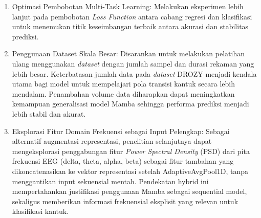 \begin{enumerate}
    \item Optimasi Pembobotan Multi-Task Learning: Melakukan eksperimen lebih lanjut pada pembobotan \textit{Loss Function} antara cabang regresi dan klasifikasi untuk menemukan titik keseimbangan terbaik antara akurasi dan stabilitas prediksi.
    \item Penggunaan Dataset Skala Besar: Disarankan untuk melakukan pelatihan ulang menggunakan \textit{dataset} dengan jumlah sampel dan durasi rekaman yang lebih besar. Keterbatasan jumlah data pada \textit{dataset} DROZY menjadi kendala utama bagi model untuk mempelajari pola transisi kantuk secara lebih mendalam. Penambahan volume data diharapkan dapat meningkatkan kemampuan generalisasi model Mamba sehingga performa prediksi menjadi lebih stabil dan akurat.
    \item Eksplorasi Fitur Domain Frekuensi sebagai Input Pelengkap: Sebagai alternatif augmentasi representasi, penelitian selanjutnya dapat mengeksplorasi penggabungan fitur \textit{Power Spectral Density} (PSD) dari pita frekuensi EEG (delta, theta, alpha, beta) sebagai fitur tambahan yang dikoncatenasikan ke vektor representasi setelah AdaptiveAvgPool1D, tanpa menggantikan input sekuensial mentah. Pendekatan hybrid ini mempertahankan justifikasi penggunaan Mamba sebagai sequential model, sekaligus memberikan informasi frekuensial eksplisit yang relevan untuk klasifikasi kantuk.
\end{enumerate}